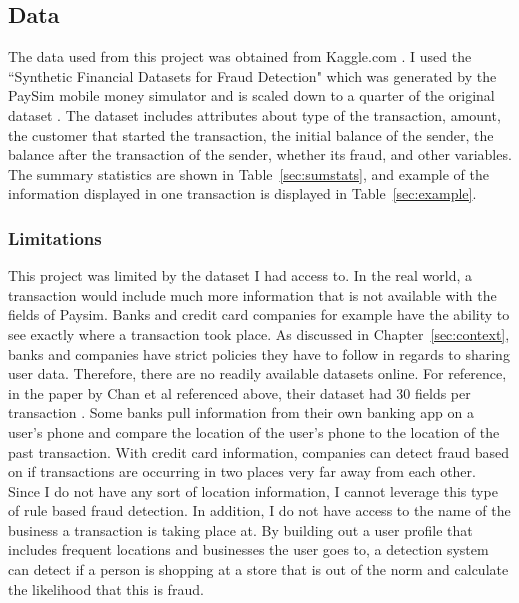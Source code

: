 \documentclass[midd]{thesis}
\begin{document}
\subsection{Data}


The data used from this project was obtained from Kaggle.com \cite{paysim}. I used the ``Synthetic Financial Datasets for Fraud Detection" which was generated by the PaySim mobile money simulator and is scaled down to a quarter of the original dataset \cite{paysim}. The dataset includes attributes about type of the transaction, amount, the customer that started the transaction, the initial balance of the sender, the balance after the transaction of the sender, whether its fraud, and other variables. The summary statistics are shown in Table~\ref{sec:sumstats}, and example of the information displayed in one transaction is displayed in Table~\ref{sec:example}.

\subsubsection{Limitations}

This project was limited by the dataset I had access to. In the real world, a transaction would include much more information that is not available with the fields of Paysim. Banks and credit card companies for example have the ability to see exactly where a transaction took place. As discussed in Chapter~\ref{sec:context}, banks and companies have strict policies they have to follow in regards to sharing user data. Therefore, there are no readily available datasets online. For reference, in the paper by Chan et al referenced above, their dataset had 30 fields per transaction \cite{Chan}. Some banks pull information from their own banking app on a user's phone and compare the location of the user's phone to the location of the past transaction. With credit card information, companies can detect fraud based on if transactions are occurring in two places very far away from each other. Since I do not have any sort of location information, I cannot leverage this type of rule based fraud detection. In addition, I do not have access to the name of the business a transaction is taking place at. By building out a user profile that includes frequent locations and businesses the user goes to, a detection system can detect if a person is shopping at a store that is out of the norm and calculate the likelihood that this is fraud. 
\end{document}
